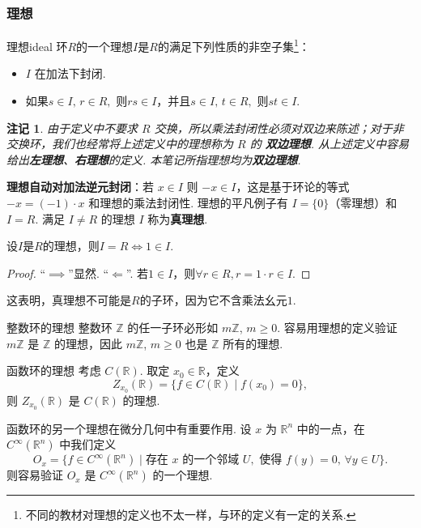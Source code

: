 \documentclass[12pt, a4paper]{ctexart}
\newtheorem*{remark}{{\color{red}\dbend}\textbf{注记}}
\begin{document}
\subsubsection{理想}
\begin{definition}{理想}{ideal}
	环$R$的一个理想$I$是$R$的满足下列性质的非空子集\footnote{不同的教材对理想的定义也不太一样，与环的定义有一定的关系. }：
	\begin{itemize}
		\item $I$ 在加法下封闭. 
		\item 如果$s \in I, \, r \in R,$ 则$rs \in I$，并且$s \in I, \, t \in R,$ 则$st \in I$. 
	\end{itemize}
\end{definition}
\begin{remark}
	由于定义中不要求 $R$ 交换，所以乘法封闭性必须对双边来陈述；对于非交换环，我们也经常将上述定义中的理想称为 $R$ 的 \textbf{双边理想}. 从上述定义中容易给出\textbf{左理想}、\textbf{右理想}的定义. 本笔记所指理想均为\textbf{双边理想}. 
\end{remark}
\textbf{理想自动对加法逆元封闭}：若 $x \in I$ 则 $-x \in I$，这是基于环论的等式 $-x = (-1) \cdot x$ 和理想的乘法封闭性. 理想的平凡例子有 $I = \{0\}$（零理想）和 $I = R$. 满足 $I \neq R$ 的理想 $I$ 称为\textbf{真理想}. 
\begin{proposition}{}{}
	设$I$是$R$的理想，则$I=R\iff 1\in I.$
\end{proposition}
\begin{proof}
	“$\implies$”显然. “$\Longleftarrow$”. 若$1\in I$，则$\forall r\in R, r=1\cdot r\in I.$
\end{proof}
这表明，真理想不可能是$R$的子环，因为它不含乘法幺元$1$. 
\begin{example}{整数环的理想}{}
	整数环 $\mathbb{Z}$ 的任一子环必形如 $m\mathbb{Z}$, $m \geqslant 0$. 容易用理想的定义验证 $m\mathbb{Z}$ 是 $\mathbb{Z}$ 的理想，因此 $m\mathbb{Z}$, $m \geqslant 0$ 也是 $\mathbb{Z}$ 所有的理想. 
\end{example}
\begin{example}{函数环的理想}{}
	考虑 $C(\mathbb{R})$. 取定 $x_0 \in \mathbb{R}$，定义
	\[ Z_{x_0}(\mathbb{R}) = \{ f \in C(\mathbb{R}) \mid f(x_0) = 0 \}, \]
	则 $Z_{x_0}(\mathbb{R})$ 是 $C(\mathbb{R})$ 的理想. 
	
	函数环的另一个理想在微分几何中有重要作用. 设 $x$ 为 $\mathbb{R}^n$ 中的一点，在 $C^{\infty}(\mathbb{R}^n)$ 中我们定义
	\[ O_x = \{ f \in C^{\infty}(\mathbb{R}^n) \mid \text{存在 } x \text{ 的一个邻域 } U, \text{ 使得 } f(y) = 0, \, \forall y \in U \}. \]
	则容易验证 $O_x$ 是 $C^{\infty}(\mathbb{R}^n)$ 的一个理想. 
\end{example}
\end{document}
